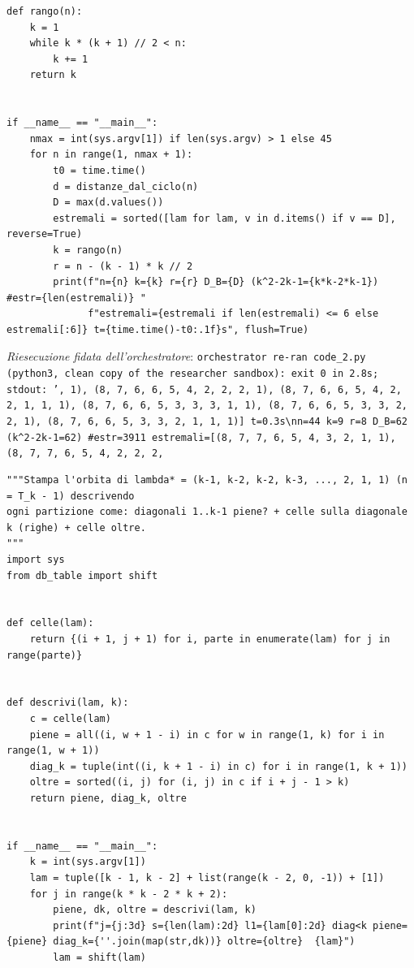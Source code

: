 \documentclass[11pt,a4paper]{article}
\begin{document}
\begin{lstlisting}[caption={attempt\_001 code\_2 [python, rigore exact] — Modulo di supporto (db\_table.py): enumerazione delle partizioni di n, shift B, calcolo di  — verdetto del Referee: UNKNOWN\_STATUS}]
def rango(n):
    k = 1
    while k * (k + 1) // 2 < n:
        k += 1
    return k


if __name__ == "__main__":
    nmax = int(sys.argv[1]) if len(sys.argv) > 1 else 45
    for n in range(1, nmax + 1):
        t0 = time.time()
        d = distanze_dal_ciclo(n)
        D = max(d.values())
        estremali = sorted([lam for lam, v in d.items() if v == D], reverse=True)
        k = rango(n)
        r = n - (k - 1) * k // 2
        print(f"n={n} k={k} r={r} D_B={D} (k^2-2k-1={k*k-2*k-1}) #estr={len(estremali)} "
              f"estremali={estremali if len(estremali) <= 6 else estremali[:6]} t={time.time()-t0:.1f}s", flush=True)

\end{lstlisting}
\noindent\emph{Riesecuzione fidata dell'orchestratore}: \texttt{orchestrator re-ran code\_2.py (python3, clean copy of the researcher sandbox): exit 0 in 2.8s; stdout: ', 1), (8, 7, 6, 6, 5, 4, 2, 2, 2, 1), (8, 7, 6, 6, 5, 4, 2, 2, 1, 1, 1), (8, 7, 6, 6, 5, 3, 3, 3, 1, 1), (8, 7, 6, 6, 5, 3, 3, 2, 2, 1), (8, 7, 6, 6, 5, 3, 3, 2, 1, 1, 1)] t=0.3s\textbackslash{}nn=44 k=9 r=8 D\_B=62 (k\textasciicircum{}2-2k-1=62) \#estr=3911 estremali=[(8, 7, 7, 6, 5, 4, 3, 2, 1, 1), (8, 7, 7, 6, 5, 4, 2, 2, 2, }
\begin{lstlisting}[caption={attempt\_001 code\_3 [python, rigore exact] — Esplorazione (non usata nella prova): stampa l'orbita di lambda*\_k in forma diagonale (dia — verdetto del Referee: UNKNOWN\_STATUS}]
"""Stampa l'orbita di lambda* = (k-1, k-2, k-2, k-3, ..., 2, 1, 1) (n = T_k - 1) descrivendo
ogni partizione come: diagonali 1..k-1 piene? + celle sulla diagonale k (righe) + celle oltre.
"""
import sys
from db_table import shift


def celle(lam):
    return {(i + 1, j + 1) for i, parte in enumerate(lam) for j in range(parte)}


def descrivi(lam, k):
    c = celle(lam)
    piene = all((i, w + 1 - i) in c for w in range(1, k) for i in range(1, w + 1))
    diag_k = tuple(int((i, k + 1 - i) in c) for i in range(1, k + 1))
    oltre = sorted((i, j) for (i, j) in c if i + j - 1 > k)
    return piene, diag_k, oltre


if __name__ == "__main__":
    k = int(sys.argv[1])
    lam = tuple([k - 1, k - 2] + list(range(k - 2, 0, -1)) + [1])
    for j in range(k * k - 2 * k + 2):
        piene, dk, oltre = descrivi(lam, k)
        print(f"j={j:3d} s={len(lam):2d} l1={lam[0]:2d} diag<k piene={piene} diag_k={''.join(map(str,dk))} oltre={oltre}  {lam}")
        lam = shift(lam)

\end{lstlisting}
\end{document}
